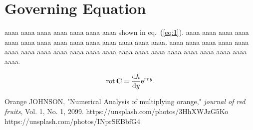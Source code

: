 \documentclass[dvipdfmx,a4j,11pt]{article}
\begin{document}
%
%
%
\section{Governing Equation}
%
%
% 
aaaa aaaa aaaa aaaa aaaa aaaa aaaa 
shown in eq.~(\ref{eq:1}).   
aaaa aaaa aaaa aaaa aaaa aaaa aaaa 
aaaa aaaa aaaa aaaa aaaa aaaa aaaa. 
aaaa aaaa aaaa aaaa aaaa aaaa aaaa 
aaaa aaaa aaaa aaaa aaaa aaaa aaaa 
aaaa aaaa aaaa aaaa aaaa aaaa aaaa. 

\begin{equation}
	\label{eq:1}
	\operatorname{rot} {\bf C} = \frac{{\rm d} h}{{\rm d} y} {\rm e}^{rry}.
\end{equation}

%
%
%
\begin{thebibliography}{99}
	 Orange JOHNSON, "Numerical Analysis of multiplying orange," {\it journal of red fruits}, Vol. 1, No. 1, 2099.
	 https://unsplash.com/photos/3HhXWJzG5Ko
	 https://unsplash.com/photos/INprSEBbfG4
\end{thebibliography}
%
%
%
\end{document}
